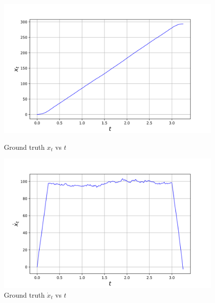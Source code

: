 \begin{figure}[H]
    \centering
    \begin{minipage}{0.49\linewidth}
        \centering
        \includegraphics[width=\linewidth]{plots/part1-a.1.png}
        \caption{Ground truth $x_t$ vs $t$}
    \end{minipage}
    \hfill
    \begin{minipage}{0.49\linewidth}
        \centering
        \includegraphics[width=\linewidth]{plots/part1-a.2.png}
        \caption{Ground truth $\dot{x}_t$ vs $t$}
    \end{minipage}
\end{figure}

